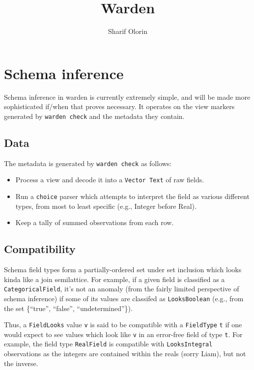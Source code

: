 \documentclass[a4paper]{article}
\title{Warden}
\author{Sharif Olorin}
\begin{document}
\maketitle

\tableofcontents

\newpage

\section{Schema inference}\label{schema-inference}

Schema inference in warden is currently extremely simple, and will be
made more sophisticated if/when that proves necessary. It operates on
the view markers generated by \texttt{warden\ check} and the metadata
they contain.

\subsection{Data}\label{data}

The metadata is generated by \texttt{warden\ check} as follows:

\begin{itemize}
\item
  Process a view and decode it into a \texttt{Vector\ Text} of raw
  fields.
\item
  Run a \texttt{choice} parser which attempts to interpret the field as
  various different types, from most to least specific (e.g., Integer
  before Real).
\item
  Keep a tally of summed observations from each row.
\end{itemize}

\subsection{Compatibility}\label{compatibility}

Schema field types form a partially-ordered set under set inclusion
which looks kinda like a join semilattice. For example, if a given field
is classified as a \texttt{CategoricalField}, it's not an anomaly (from
the fairly limited perspective of schema inference) if some of its
values are classifed as \texttt{LooksBoolean} (e.g., from the set
\{``true'', ``false'', ``undetermined''\}).

Thus, a \texttt{FieldLooks} value \texttt{v} is said to be compatible
with a \texttt{FieldType} \texttt{t} if one would expect to see values
which look like \texttt{v} in an error-free field of type \texttt{t}.
For example, the field type \texttt{RealField} is compatible with
\texttt{LooksIntegral} observations as the integers are contained within
the reals (sorry Liam), but not the inverse.
\end{document}
